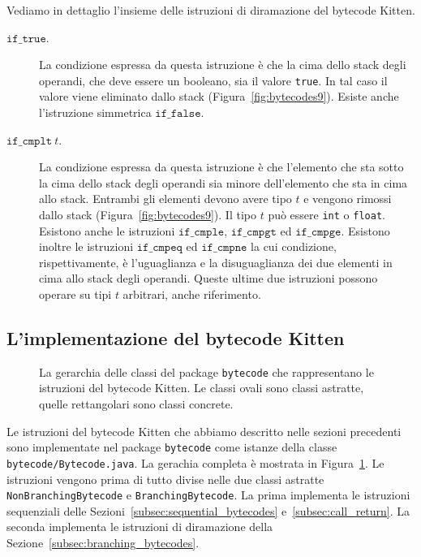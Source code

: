 Vediamo in dettaglio l'insieme delle istruzioni di diramazione del
bytecode Kitten.
%
\begin{description}
\item[\underline{$\mathtt{if\_true}$}.]
  La condizione espressa da questa istruzione \`e che la cima dello stack degli
  operandi, che deve essere un booleano, sia il valore \texttt{true}.
  In tal caso il valore
  viene eliminato dallo stack (Figura~\ref{fig:bytecodes9}).
  Esiste anche l'istruzione simmetrica $\mathtt{if\_false}$.
\item[\underline{$\mathtt{if\_cmplt}\ t$}.]
  La condizione espressa da questa istruzione \`e che l'elemento che sta
  sotto la cima dello stack degli operandi sia minore dell'elemento che sta in
  cima allo stack. Entrambi gli elementi devono avere tipo $t$
  e vengono rimossi dallo
  stack (Figura~\ref{fig:bytecodes9}). Il tipo $t$ pu\`o essere \texttt{int}
  o \texttt{float}. Esistono anche le istruzioni $\mathtt{if\_cmple}$,
  $\mathtt{if\_cmpgt}$ ed $\mathtt{if\_cmpge}$. Esistono inoltre le
  istruzioni $\mathtt{if\_cmpeq}$ ed $\mathtt{if\_cmpne}$ la cui condizione,
  rispettivamente, \`e l'uguaglianza e la disuguaglianza dei due elementi
  in cima allo stack degli operandi. Queste ultime due istruzioni
  possono operare su tipi $t$ arbitrari, anche riferimento.
\end{description}
%
\subsection{L'implementazione del bytecode Kitten}
  \label{subsec:bytecode_implementation}
%
\begin{figure}[t]
\begin{center}
\end{center}
\caption{La gerarchia delle classi del package \texttt{bytecode} che rappresentano le istruzioni del bytecode Kitten. Le classi ovali sono classi astratte, quelle rettangolari sono classi concrete.}
  \label{fig:bytecodes_hierarchy}
\end{figure}
%
Le istruzioni del bytecode Kitten che abbiamo descritto nelle sezioni
precedenti sono implementate nel package \texttt{bytecode}
come istanze della classe \texttt{bytecode/Bytecode.java}.
La gerachia completa \`e mostrata in Figura~\ref{fig:bytecodes_hierarchy}.
Le istruzioni vengono prima di tutto divise nelle due classi astratte
\texttt{NonBranchingBytecode} e \texttt{BranchingBytecode}.
La prima implementa le istruzioni sequenziali
delle Sezioni~\ref{subsec:sequential_bytecodes}
e~\ref{subsec:call_return}. La seconda implementa le istruzioni di
diramazione della Sezione~\ref{subsec:branching_bytecodes}.

